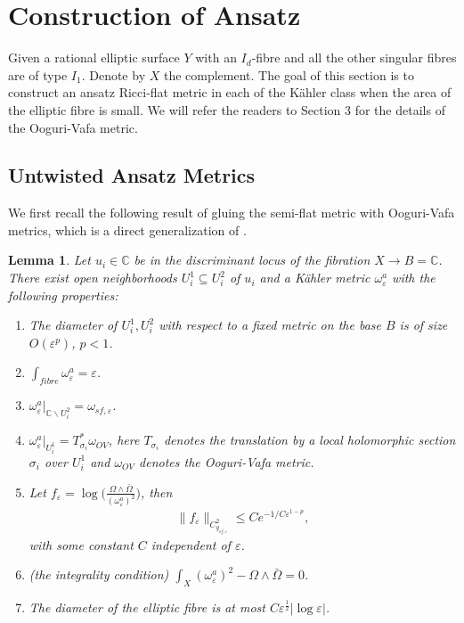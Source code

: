 \documentclass[11pt]{amsart}
\theoremstyle{plain}
\newtheorem{lem}[thm]{Lemma}
\theoremstyle{definition}
\numberwithin{equation}{section}
\renewcommand{\le}{\leqslant}
\renewcommand{\epsilon}{\varepsilon}
\begin{document}
 

\section{Construction of Ansatz} \label{sec: ansatz}
     
Given a rational elliptic surface $Y$ with an $I_d$-fibre and all the other singular fibres are of type $I_1$. Denote by $X$ the complement. The goal of this section is to construct an ansatz Ricci-flat metric in each of the K\"ahler class when the area of the elliptic fibre is small. 
 We will refer the readers to Section 3 \cite{GW} for the details of the Ooguri-Vafa metric. 
 
 \subsection{Untwisted Ansatz Metrics} We first recall the following result of gluing the semi-flat metric with Ooguri-Vafa metrics, which is a direct generalization of \cite[Theorem 4.4]{GW}.
\begin{lem}\label{ansatz metric} 
	Let $u_i\in \mathbb{C}$ be in the discriminant locus of the fibration ${X}\rightarrow B=\mathbb{C}$. There exist open neighborhoods $U_i^1\subseteq U_i^2$ of $u_i$ and a K\"ahler metric $\omega^a_{\epsilon}$ with the following properties:
	\begin{enumerate}
		\item The diameter of $U_i^1, U_i^2$ with respect to a fixed metric on the base $B$ is of size $O(\epsilon^p)$, $p<1$.  
		\item $\int_{fibre} \omega^a_{\epsilon}=\epsilon$.
		\item ${\omega}^a_{\epsilon}|_{\mathbb{C}\backslash U^2_i}={\omega}_{sf,\epsilon}$.
		\item ${\omega}^a_{\epsilon}|_{U^1_i}=T_{\sigma_i}^*\omega_{OV}$, here $T_{\sigma_i}$ denotes the translation by a local holomorphic section $\sigma_i$ over $U^{1}_i$ and $\omega_{OV}$ denotes the Ooguri-Vafa metric. 
		\item Let $f_{\epsilon}=\log{\bigg( \frac{\Omega\wedge \bar{\Omega}}{({\omega}^a_{\epsilon})^2}\bigg)}$, then 
		\begin{align*}
			\|f_{\epsilon} \|_{C^2_{g_{sf,\epsilon}}}\le Ce^{-1/C\epsilon^{1-p}},
		\end{align*} with some constant $C$ independent of $\epsilon$. 
	   \item (the integrality condition) $\int_{X} (\omega^a_{\epsilon})^2-\Omega\wedge \bar{\Omega}=0$.
	   \item The diameter of the elliptic fibre is at most $C\epsilon^{\frac{1}{2}}|\log{\epsilon}|$.  
	\end{enumerate}
\end{lem}
\end{document}
